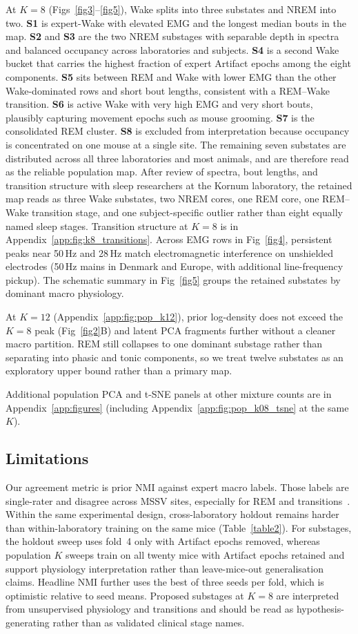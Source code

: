 \documentclass[10pt,letterpaper]{article}
\newcommand{\apdx}[1]{Appendix~\ref{#1}}
\newcommand{\papersubsection}[1]{\subsection{#1}}
\newcommand{\papersubsection}[1]{\subsection*{#1}}
\begin{document}
At $K{=}8$ (Figs~\ref{fig3}--\ref{fig5}), Wake splits into three substates and NREM into two.
\textbf{S1} is expert-Wake with elevated EMG and the longest median bouts in the map.
\textbf{S2} and \textbf{S3} are the two NREM substages with separable depth in spectra and balanced occupancy across laboratories and subjects.
\textbf{S4} is a second Wake bucket that carries the highest fraction of expert Artifact epochs among the eight components.
\textbf{S5} sits between REM and Wake with lower EMG than the other Wake-dominated rows and short bout lengths, consistent with a REM--Wake transition.
\textbf{S6} is active Wake with very high EMG and very short bouts, plausibly capturing movement epochs such as mouse grooming.
\textbf{S7} is the consolidated REM cluster.
\textbf{S8} is excluded from interpretation because occupancy is concentrated on one mouse at a single site. The remaining seven substates are distributed across all three laboratories and most animals, and are therefore read as the reliable population map.
After review of spectra, bout lengths, and transition structure with sleep researchers at the Kornum laboratory, the retained map reads as three Wake substates, two NREM cores, one REM core, one REM--Wake transition stage, and one subject-specific outlier rather than eight equally named sleep stages.
Transition structure at $K{=}8$ is in \apdx{app:fig:k8_transitions}.
Across EMG rows in Fig~\ref{fig4}, persistent peaks near 50\,Hz and 28\,Hz match electromagnetic interference on unshielded electrodes (50\,Hz mains in Denmark and Europe, with additional line-frequency pickup). The schematic summary in Fig~\ref{fig5} groups the retained substates by dominant macro physiology.

At $K{=}12$ (\apdx{app:fig:pop_k12}), prior log-density does not exceed the $K{=}8$ peak (Fig~\ref{fig2}B) and latent PCA fragments further without a cleaner macro partition. REM still collapses to one dominant substage rather than separating into phasic and tonic components, so we treat twelve substates as an exploratory upper bound rather than a primary map.

Additional population PCA and t-SNE panels at other mixture counts are in \apdx{app:figures} (including \apdx{app:fig:pop_k08_tsne} at the same $K$).

\papersubsection{Limitations}
\label{sec:limitations}

Our agreement metric is prior NMI against expert macro labels.
Those labels are single-rater and disagree across MSSV sites, especially for REM and transitions~\cite{rose2026consensus}.
Within the same experimental design, cross-laboratory holdout remains harder than within-laboratory training on the same mice (Table~\ref{table2}).
For substages, the holdout sweep uses fold~4 only with Artifact epochs removed, whereas population $K$ sweeps train on all twenty mice with Artifact epochs retained and support physiology interpretation rather than leave-mice-out generalisation claims.
Headline NMI further uses the best of three seeds per fold, which is optimistic relative to seed means.
Proposed substages at $K{=}8$ are interpreted from unsupervised physiology and transitions and should be read as hypothesis-generating rather than as validated clinical stage names.
\end{document}
